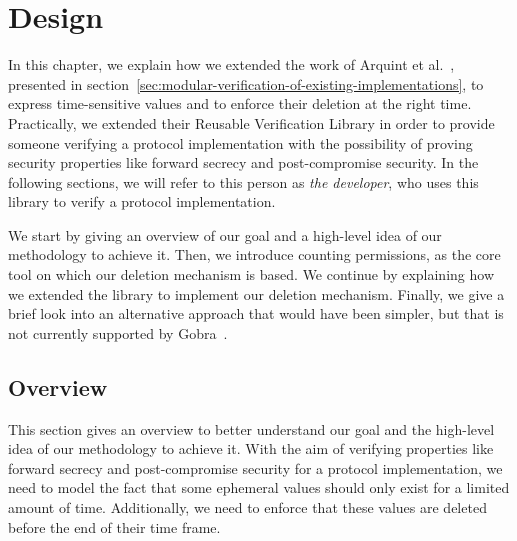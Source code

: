 
\chapter{Design}
\label{chap:design}

In this chapter, we explain how we extended the work of Arquint et al.~\cite{ArquintSchwerhoffMehtaMueller23}, presented in section~\ref{sec:modular-verification-of-existing-implementations}, to express time-sensitive values and to enforce their deletion at the right time.
Practically, we extended their Reusable Verification Library in order to provide someone verifying a protocol implementation with the possibility of proving security properties like forward secrecy and post-compromise security.
In the following sections, we will refer to this person as \emph{the developer}, who uses this library to verify a protocol implementation.

We start by giving an overview of our goal and a high-level idea of our methodology to achieve it.
Then, we introduce counting permissions, as the core tool on which our deletion mechanism is based.
We continue by explaining how we extended the library to implement our deletion mechanism.
Finally, we give a brief look into an alternative approach that would have been simpler, but that is not currently supported by Gobra~\cite{wolf2021gobra}.

\section{Overview}
\label{sec:overview}

This section gives an overview to better understand our goal and the high-level idea of our methodology to achieve it.
With the aim of verifying properties like forward secrecy and post-compromise security for a protocol implementation, we need to model the fact that some ephemeral values should only exist for a limited amount of time.
Additionally, we need to enforce that these values are deleted before the end of their time frame.


